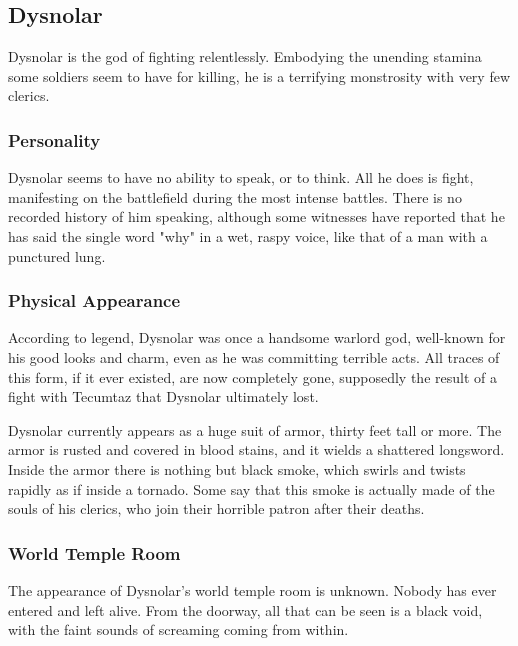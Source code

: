 \subsection*{Dysnolar}
\begin{goddesc}
\end{goddesc}
Dysnolar is the god of fighting relentlessly.
Embodying the unending stamina some soldiers seem to have for killing, he is a terrifying monstrosity with very few clerics.

\subsubsection*{Personality}
Dysnolar seems to have no ability to speak, or to think.
All he does is fight, manifesting on the battlefield during the most intense battles.
There is no recorded history of him speaking, although some witnesses have reported that he has said the single word "why" in a wet, raspy voice, like that of a man with a punctured lung.

\subsubsection*{Physical Appearance}
According to legend, Dysnolar was once a handsome warlord god, well-known for his good looks and charm, even as he was committing terrible acts.
All traces of this form, if it ever existed, are now completely gone, supposedly the result of a fight with Tecumtaz that Dysnolar ultimately lost.

Dysnolar currently appears as a huge suit of armor, thirty feet tall or more.
The armor is rusted and covered in blood stains, and it wields a shattered longsword.
Inside the armor there is nothing but black smoke, which swirls and twists rapidly as if inside a tornado.
Some say that this smoke is actually made of the souls of his clerics, who join their horrible patron after their deaths.

\subsubsection*{World Temple Room}
The appearance of Dysnolar's world temple room is unknown.
Nobody has ever entered and left alive.
From the doorway, all that can be seen is a black void, with the faint sounds of screaming coming from within.